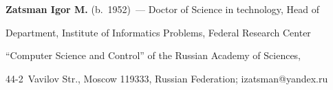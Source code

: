 \vspace*{3pt}





\noindent


\textbf{Zatsman Igor M.} (b.\ 1952)~--- Doctor of Science in technology, Head of 


Department, Institute of Informatics Problems, Federal Research Center 


``Computer Science and Control'' of the Russian Academy of Sciences,  


44-2~Vavilov Str., Moscow 119333, Russian Federation; \mbox{izatsman@yandex.ru}





\label{end\stat}








\renewcommand{\bibname}{\protect\rm Литература}



